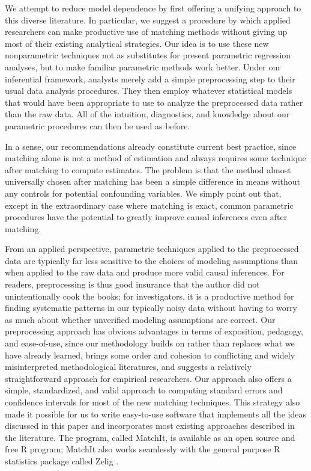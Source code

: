 \documentclass[11pt,titlepage]{article}
\begin{document}
We attempt to reduce model dependence by first offering a unifying
approach to this diverse literature.  In particular, we suggest a
procedure by which applied researchers can make productive use of
matching methods without giving up most of their existing analytical
strategies.  Our idea is to use these new nonparametric techniques
not as substitutes for  present parametric regression analyses, but
to make familiar parametric methods work better.  Under our
inferential framework, analysts merely add a simple preprocessing step
to their usual data analysis procedures.  They then employ whatever
statistical models that would have been appropriate to use to analyze
the preprocessed data rather than the raw data.  All of the intuition,
diagnostics, and knowledge about our parametric procedures can then be
used as before.

In a sense, our recommendations already constitute current best
practice, since matching alone is not a method of estimation and
always requires some technique after matching to compute estimates.
The problem is that the method almost universally chosen after
matching has been a simple difference in means without any controls
for potential confounding variables.  We simply point out that, except
in the extraordinary case where matching is exact, common parametric
procedures have the potential to greatly improve causal inferences
even after matching.

From an applied perspective, parametric techniques applied to the
preprocessed data are typically far less sensitive to the choices of
modeling assumptions than when applied to the raw data and produce
more valid causal inferences.  For readers, preprocessing is thus good
insurance that the author did not unintentionally cook the books; for
investigators, it is a productive method for finding systematic
patterns in our typically noisy data without having to worry as much
about whether unverified modeling assumptions are correct.  Our
preprocessing approach has obvious advantages in terms of exposition,
pedagogy, and ease-of-use, since our methodology builds on rather than
replaces what we have already learned, brings some order and cohesion
to conflicting and widely misinterpreted methodological literatures,
and suggests a relatively straightforward approach for empirical
researchers. Our approach also offers a simple, standardized, and
valid approach to computing standard errors and confidence intervals
for most of the new matching techniques.  This strategy also made it
possible for us to write easy-to-use software that implements all the
ideas discussed in this paper and incorporates most existing approaches
described in the literature.  The program, called MatchIt, is
available as an open source and free R program; MatchIt also works
seamlessly with the general purpose R statistics package called Zelig
\citep{ImaKinLau04}.
\end{document}
